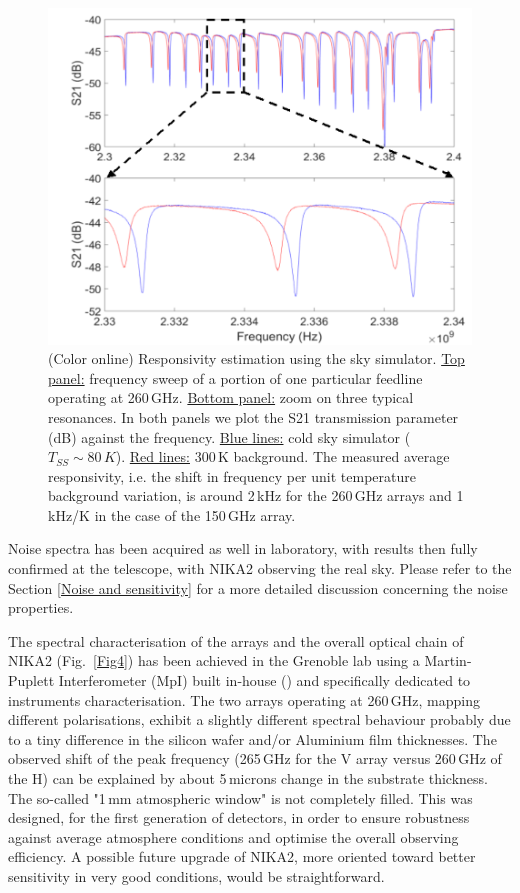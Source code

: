 \documentclass[]{aa} %
\begin{document}
\begin{figure}[h]
\begin{center}
   \centering
    \includegraphics[width=1.0\linewidth]{260GHz-H_sky.png}
    \caption{(Color online) Responsivity estimation using the sky simulator. \underline{Top panel:} frequency sweep of a portion of one particular feedline operating at 260\,GHz. \underline{Bottom panel:} zoom on three typical resonances. In both panels we plot the S21 transmission parameter (dB) against the frequency. \underline{Blue lines:} cold sky simulator ($T_{SS} \sim 80\,K$). \underline{Red lines:} 300\,K background. The measured average responsivity, i.e. the shift in frequency per unit temperature background variation, is around 2\,kHz for the 260\,GHz arrays and 1\,kHz/K in the case of the 150\,GHz array.}
         \label{Shift_f}
\end{center}
\end{figure}

Noise spectra has been acquired as well in laboratory, with results then fully confirmed at the telescope, with NIKA2 observing the real sky. Please refer to the Section \ref{Noise and sensitivity} for a more detailed discussion concerning the noise properties. 

The spectral characterisation of the arrays and the overall optical chain of NIKA2 (Fig.~\ref{Fig4}) has been achieved in the Grenoble lab using a Martin-Puplett Interferometer (MpI) built in-house (\cite{Durand2008}) and specifically dedicated to instruments characterisation. The two arrays operating at 260\,GHz, mapping different polarisations, exhibit a slightly different spectral behaviour probably due to a tiny difference in the silicon wafer and/or Aluminium film thicknesses. The observed shift of the peak frequency (265\,GHz for the V array versus 260\,GHz of the H) can be explained by about 5\,microns change in the substrate thickness. The so-called "1\,mm atmospheric window" is not completely filled. This was designed, for the first generation of detectors, in order to ensure robustness against average atmosphere conditions and optimise the overall observing efficiency. A possible future upgrade of NIKA2, more oriented toward better sensitivity in very good conditions, would be straightforward. 
\end{document}
